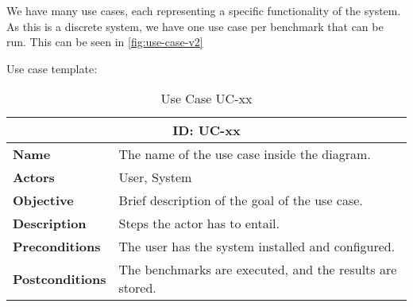 We have many use cases, each representing a specific functionality of the system. As this is a discrete system, we have one use case per benchmark that can be run. This can be seen in \autoref{fig:use-case-v2}



Use case template:

\begin{table}[H]
    \centering
    \begin{tabular}{l p{10cm}}
        \toprule
        \multicolumn{2}{c}{\textbf{ID: UC-xx}} \\
        \toprule
        \textbf{Name}               &  The name of the use case inside the diagram. \\
        \textbf{Actors}             &  User, System \\
        \textbf{Objective}          &  Brief description of the goal of the use case. \\
        \textbf{Description}        &  Steps the actor has to entail. \\
        \textbf{Preconditions}      &  The user has the system installed and configured. \\
        \textbf{Postconditions}     &  The benchmarks are executed, and the results are stored. \\
    \end{tabular}
    \caption{Use Case UC-xx}
    \label{tab:uc-xx}
\end{table}

